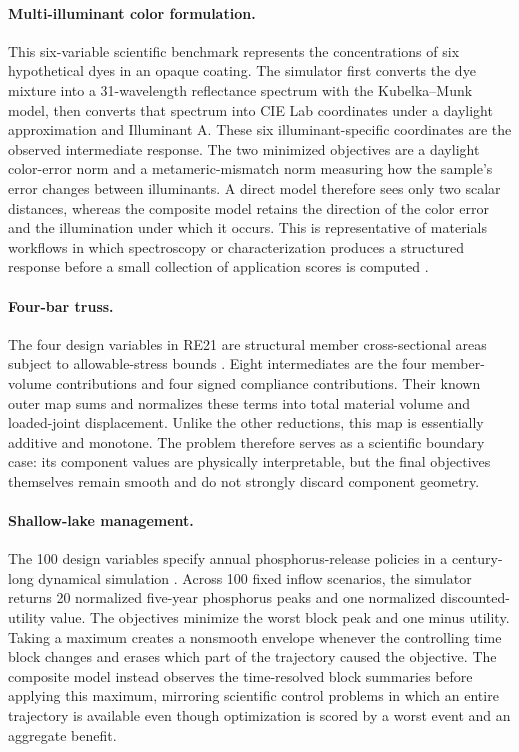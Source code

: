\documentclass{article}
\begin{document}
\paragraph{Multi-illuminant color formulation.}
This six-variable scientific benchmark represents the concentrations of six
hypothetical dyes in an opaque coating.  The simulator first converts the dye
mixture into a 31-wavelength reflectance spectrum with the Kubelka--Munk model,
then converts that spectrum into CIE Lab coordinates under a daylight
approximation and Illuminant A.  These six illuminant-specific coordinates are
the observed intermediate response.  The two minimized objectives are a
daylight color-error norm and a metameric-mismatch norm measuring how the
sample's error changes between illuminants.  A direct model therefore sees
only two scalar distances, whereas the composite model retains the direction
of the color error and the illumination under which it occurs.  This is
representative of materials workflows in which spectroscopy or
characterization produces a structured response before a small collection of
application scores is computed \cite{chaoucha2022color,kubelka1931optik}.

\paragraph{Four-bar truss.}
The four design variables in RE21 are structural member cross-sectional areas
subject to allowable-stress bounds \cite{tanabe2020realworld}.  Eight
intermediates are the four member-volume contributions and four signed
compliance contributions.  Their known outer map sums and normalizes these
terms into total material volume and loaded-joint displacement.  Unlike the
other reductions, this map is essentially additive and monotone.  The problem
therefore serves as a scientific boundary case: its component values are
physically interpretable, but the final objectives themselves remain smooth
and do not strongly discard component geometry.

\paragraph{Shallow-lake management.}
The 100 design variables specify annual phosphorus-release policies in a
century-long dynamical simulation \cite{carpenter1999lake,ward2015tipping}.
Across 100 fixed inflow scenarios, the simulator returns 20 normalized
five-year phosphorus peaks and one normalized discounted-utility value.  The
objectives minimize the worst block peak and one minus utility.  Taking a
maximum creates a nonsmooth envelope whenever the controlling time block
changes and erases which part of the trajectory caused the objective.  The
composite model instead observes the time-resolved block summaries before
applying this maximum, mirroring scientific control problems in which an
entire trajectory is available even though optimization is scored by a worst
event and an aggregate benefit.
\end{document}
